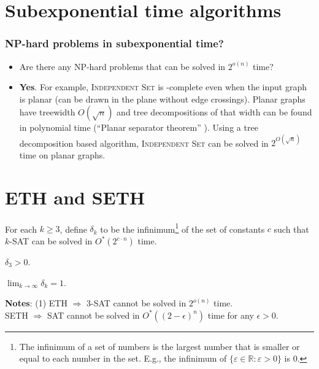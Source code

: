 \section{Subexponential time algorithms}

\begin{frame}
	\frametitle{NP-hard problems in subexponential time?}
	
	\begin{itemize}
		\item Are there any NP-hard problems that can be solved in $2^{o(n)}$ time?
		\pause
		\item \textbf{Yes}. For example, \textsc{Independent Set} is \NP-complete even when the input graph is planar (can be drawn in the plane without edge crossings). Planar graphs have treewidth $O(\sqrt{n})$ and tree decompositions of that width can be found in polynomial time (``Planar separator theorem'' ). Using a tree decomposition based algorithm, \textsc{Independent Set} can be solved in $2^{O(\sqrt{n})}$ time on planar graphs.
	\end{itemize}
\end{frame}

\section{ETH and SETH}

\begin{frame}
 \begin{definition}
  For each $k\ge 3$, define \alert{$\delta_k$} to be the infinimum\footnote[frame]{The infinimum of a set of numbers is the largest number that is smaller or equal to each number in the set. E.g., the infinimum of $\{\varepsilon \in \mathbb{R} : \varepsilon>0\}$ is $0$.} of the set of constants $c$ such that $k$-SAT can be solved in $O^*(2^{c\cdot n})$ time.
 \end{definition}
 
 \begin{conjecture}
  $\delta_3>0$.
 \end{conjecture}

 \begin{conjecture}
  $\lim_{k\rightarrow \infty}\delta_k=1$.
 \end{conjecture}
 
 \noindent
 \textbf{Notes}: (1) ETH $\Rightarrow$ 3-SAT cannot be solved in $2^{o(n)}$ time.\\
 SETH $\Rightarrow$ SAT cannot be solved in $O^*((2-\epsilon)^n)$ time for any $\epsilon>0$.

\end{frame}

